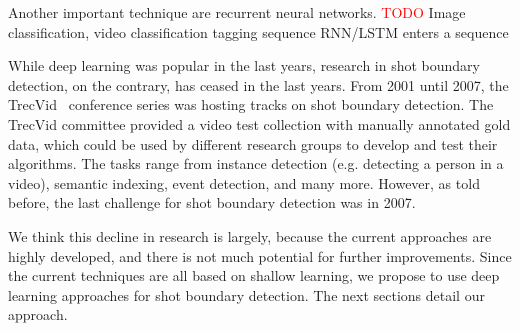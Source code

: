 Another important technique are recurrent neural networks.
\textcolor{red}{TODO}
Image classification, video classification
tagging sequence
RNN/LSTM
enters a sequence

While deep learning was popular in the last years, research in shot boundary detection, on the contrary, has ceased in the last years.
From 2001 until 2007, the TrecVid~\cite{trecvid} conference series was hosting tracks on shot boundary detection.
The TrecVid committee provided a video test collection with manually annotated gold data, which could be used by different research groups to develop and test their algorithms.
The tasks range from instance detection (e.g. detecting a person in a video), semantic indexing, event detection, and many more.
However, as told before, the last challenge for shot boundary detection was in 2007.

We think this decline in research is largely, because the current approaches are highly developed, and there is not much potential for further improvements.
Since the current techniques are all based on shallow learning, we propose to use deep learning approaches for shot boundary detection.
The next sections detail our approach.

